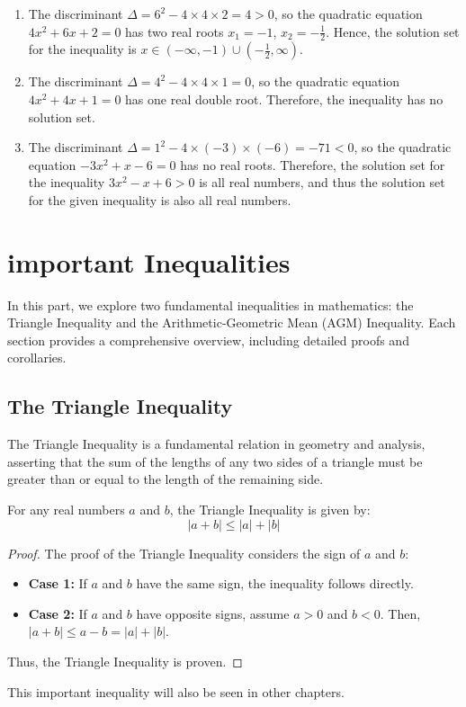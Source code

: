 \documentclass[
	12pt, %
	fleqn, %
	a4paper, %
]{LegrandOrangeBook}
\begin{document}
\begin{enumerate}
    \item The discriminant \(\Delta = 6^2 - 4 \times 4 \times 2 = 4 > 0\), so the quadratic equation \(4x^2 + 6x + 2 = 0\) has two real roots \(x_1 = -1\), \(x_2 = -\frac{1}{2}\).
    Hence, the solution set for the inequality is \(x \in \left(-\infty, -1\right) \cup \left(-\frac{1}{2}, \infty\right)\).

    \item The discriminant \(\Delta = 4^2 - 4 \times 4 \times 1 = 0\), so the quadratic equation \(4x^2 + 4x + 1 = 0\) has one real double root. Therefore, the inequality has no solution set.

    \item The discriminant \(\Delta = 1^2 - 4 \times (-3) \times (-6) = -71 < 0\), so the quadratic equation \(-3x^2 + x - 6 = 0\) has no real roots.
    Therefore, the solution set for the inequality \(3x^2 - x + 6 > 0\) is all real numbers, and thus the solution set for the given inequality is also all real numbers.
\end{enumerate}

\section{important Inequalities}
In this part, we explore two fundamental inequalities in mathematics: the Triangle Inequality and the Arithmetic-Geometric Mean (AGM) Inequality. Each section provides a comprehensive overview, including detailed proofs and corollaries.
\subsection{The Triangle Inequality}
The Triangle Inequality is a fundamental relation in geometry and analysis, asserting that the sum of the lengths of any two sides of a triangle must be greater than or equal to the length of the remaining side.
    \begin{definition}
        For any real numbers \( a \) and \( b \), the Triangle Inequality is given by:
        \[ |a + b| \leq |a| + |b| \]
    \end{definition}
    \begin{proof}
        The proof of the Triangle Inequality considers the sign of \( a \) and \( b \):
    \begin{itemize}
     \item \textbf{Case 1:} If \( a \) and \( b \) have the same sign, the inequality follows directly.
        \item \textbf{Case 2:} If \( a \) and \( b \) have opposite signs, assume \( a > 0 \) and \( b < 0      \). Then, \( |a + b| \leq a - b = |a| + |b| \).
    \end{itemize}
    Thus, the Triangle Inequality is proven.
    \end{proof}
    \begin{remark}
        This important inequality will also be seen in other chapters.
    \end{remark}
\end{document}
